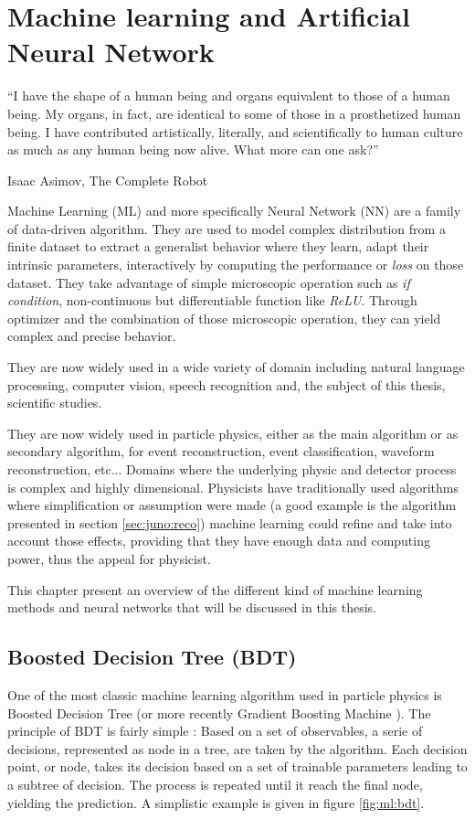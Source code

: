 \chapter{Machine learning and Artificial Neural Network}
\label{sec:ml}

\epigraph{``I have the shape of a human being and organs equivalent to those of a human being. My organs, in fact, are identical to some of those in a prosthetized human being. I have contributed artistically, literally, and scientifically to human culture as much as any human being now alive. What more can one ask?''}{Isaac Asimov, The Complete Robot }

Machine Learning (ML) and more specifically Neural Network (NN) are a family of data-driven algorithm. They are used to model complex distribution from a finite dataset to extract a generalist behavior where they learn, adapt their intrinsic parameters, interactively by computing the performance or \textit{loss} on those dataset. They take advantage of simple microscopic operation such as \textit{if condition}, non-continuous but differentiable function like \textit{ReLU}. Through optimizer and the combination of those microscopic operation, they can yield complex and precise behavior.

They are now widely used in a wide variety of domain including natural language processing, computer vision, speech recognition and, the subject of this thesis, scientific studies.

They are now widely used in particle physics, either as the main algorithm or as secondary algorithm, for event reconstruction, event classification, waveform reconstruction, etc... Domains where the underlying physic and detector process is complex and highly dimensional. Physicists have traditionally used algorithms where simplification or assumption were made (a good example is the algorithm presented in section \ref{sec:juno:reco}) machine learning could refine and take into account those effects, providing that they have enough data and computing power, thus the appeal for physicist.

This chapter present an overview of the different kind of machine learning methods and neural networks that will be discussed in this thesis.
\section{Boosted Decision Tree (BDT)}
\label{sec:ml:bdt}

One of the most classic machine learning algorithm used in particle physics is Boosted Decision Tree \cite{breiman_classification_2017} (or more recently Gradient Boosting Machine \cite{friedman_greedy_2001}). The principle of BDT is fairly simple : Based on a set of observables, a serie of decisions, represented as node in a tree, are taken by the algorithm. Each decision point, or node, takes its decision based on a set of trainable parameters leading to a subtree of decision. The process is repeated until it reach the final node, yielding the prediction. A simplistic example is given in figure \ref{fig:ml:bdt}.

